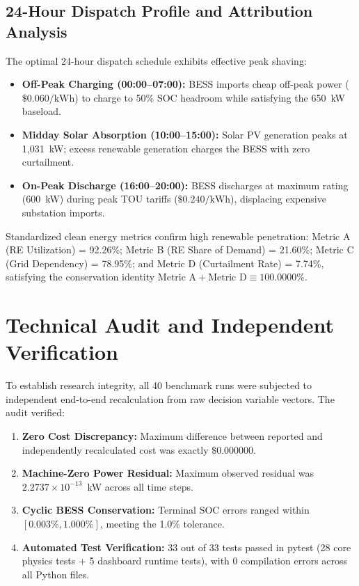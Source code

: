 \documentclass[conference]{IEEEtran}
\begin{document}
\subsection{24-Hour Dispatch Profile and Attribution Analysis}
The optimal 24-hour dispatch schedule exhibits effective peak shaving:
\begin{itemize}
    \item \textbf{Off-Peak Charging (00:00--07:00):} BESS imports cheap off-peak power ($\$0.060/\text{kWh}$) to charge to 50\% SOC headroom while satisfying the 650~kW baseload.
    \item \textbf{Midday Solar Absorption (10:00--15:00):} Solar PV generation peaks at 1,031~kW; excess renewable generation charges the BESS with zero curtailment.
    \item \textbf{On-Peak Discharge (16:00--20:00):} BESS discharges at maximum rating (600~kW) during peak TOU tariffs ($\$0.240/\text{kWh}$), displacing expensive substation imports.
\end{itemize}

Standardized clean energy metrics confirm high renewable penetration: Metric A (RE Utilization) = 92.26\%; Metric B (RE Share of Demand) = 21.60\%; Metric C (Grid Dependency) = 78.95\%; and Metric D (Curtailment Rate) = 7.74\%, satisfying the conservation identity $\text{Metric A} + \text{Metric D} \equiv 100.0000\%$.

\section{Technical Audit and Independent Verification}
To establish research integrity, all 40 benchmark runs were subjected to independent end-to-end recalculation from raw decision variable vectors. The audit verified:
\begin{enumerate}
    \item \textbf{Zero Cost Discrepancy:} Maximum difference between reported and independently recalculated cost was exactly $\$0.000000$.
    \item \textbf{Machine-Zero Power Residual:} Maximum observed residual was $2.2737 \times 10^{-13}$~kW across all time steps.
    \item \textbf{Cyclic BESS Conservation:} Terminal SOC errors ranged within $[0.003\%, 1.000\%]$, meeting the 1.0\% tolerance.
    \item \textbf{Automated Test Verification:} 33 out of 33 tests passed in pytest (28 core physics tests + 5 dashboard runtime tests), with 0 compilation errors across all Python files.
\end{enumerate}
\end{document}

